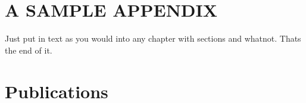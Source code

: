 \documentclass[MTech]{iitmdiss}
\begin{document}

 \appendix
 \chapter{A SAMPLE APPENDIX}
 Just put in text as you would into any chapter with sections and
 whatnot.  Thats the end of it.


\chapter*{Publications}
\vspace{-0.3cm}


\pagebreak
\begin{singlespace}
  \begin{small}
	
  \end{small}
\end{singlespace}

\end{document}

